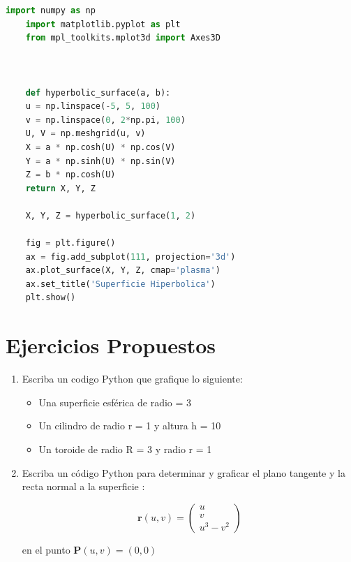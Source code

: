 \documentclass{article}
\begin{document}
\begin{lstlisting}[language=Python, caption={Ejemplo de código Python para superficie hiperbólica}, label={python}]
	import numpy as np
	import matplotlib.pyplot as plt
	from mpl_toolkits.mplot3d import Axes3D
	
	

	def hyperbolic_surface(a, b):
	u = np.linspace(-5, 5, 100)
	v = np.linspace(0, 2*np.pi, 100)
	U, V = np.meshgrid(u, v)
	X = a * np.cosh(U) * np.cos(V)
	Y = a * np.sinh(U) * np.sin(V)
	Z = b * np.cosh(U)
	return X, Y, Z
	
	X, Y, Z = hyperbolic_surface(1, 2)
	
	fig = plt.figure()
	ax = fig.add_subplot(111, projection='3d')
	ax.plot_surface(X, Y, Z, cmap='plasma')
	ax.set_title('Superficie Hiperbolica')
	plt.show()
\end{lstlisting}
	
\section{Ejercicios Propuestos}

\begin{enumerate}
	\item Escriba un codigo Python que grafique lo siguiente:
	
		\begin{itemize}
			\item Una superficie esférica de radio = 3
			\item Un cilindro de radio r = 1 y altura h = 10
			\item Un toroide de radio R = 3 y radio r = 1
		\end{itemize}
		
	\item Escriba un código Python para determinar y graficar el plano tangente y la recta normal a la superficie :
	
	$$
	\textbf{r}(u, v) = \begin{pmatrix} u \\ v \\ u^3-v^2 \end{pmatrix}
	$$
	
	en el punto $ \textbf{P}(u, v) = (0, 0) $
	
\end{enumerate}


	
\end{document}
